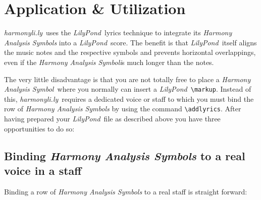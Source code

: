 \documentclass[
  DIV=calc,
  BCOR=5mm,
  12pt,
  headings=small,
  oneside,
  abstract=true,
  toc=bib,
  xcolor=dvipsnames,
  openany,
  ngerman,english]{scrartcl}
\newcommand{\hlyn}[0]{\textit{harmonyli.ly}}
\newcommand{\lily}[0]{\textit{LilyPond}}
\newcommand{\has}[1]{\textit{Harmony Analysis Symbol#1}}
\begin{document}
\section{Application \& Utilization}

\hlyn\ uses the \lily\ lyrics technique to integrate its \has{s} into a \lily\
score. The benefit is that \lily\ itself aligns the music notes and the
respective symbols and prevents horizontal overlappings, even if the \has is
much longer than the notes.

The very little disadvantage is that you are not totally free to place a \has\
where you normally can insert a \lily\ \texttt{\textbackslash markup}. Instead
of this, \hlyn\ requires a dedicated voice or staff to which you must bind the
row of \has{s} by using the command \texttt{\textbackslash addlyrics}. After
having prepared your \lily\ file as described above you have three opportunities
to do so:

\subsection{Binding \has{s} to a real voice in a staff}

Binding a row of \has{s} to a real staff is straight forward: 
\end{document}
